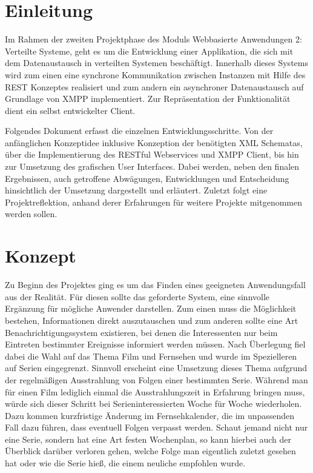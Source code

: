 \documentclass[a4paper]{article}
\begin{document}



\newpage

\tableofcontents

\newpage


\section{Einleitung}
Im Rahmen der zweiten Projektphase des Moduls Webbasierte Anwendungen 2: Verteilte Systeme, geht es um die Entwicklung einer Applikation, die sich mit dem Datenaustausch in verteilten Systemen beschäftigt. Innerhalb dieses Systems wird zum einen eine synchrone Kommunikation zwischen Instanzen mit Hilfe des REST Konzeptes realisiert und zum andern ein asynchroner Datenaustausch auf Grundlage von XMPP implementiert. Zur Repräsentation der Funktionalität dient ein selbst entwickelter Client. 

\parskip 12pt
\parindent 0pt
Folgendes Dokument erfasst die einzelnen Entwicklungsschritte. Von der anfänglichen Konzeptidee inklusive Konzeption der benötigten XML Schematas, über die Implementierung des RESTful Webservices und XMPP Client, bis hin zur Umsetzung des grafischen User Interfaces. Dabei werden, neben den finalen Ergebnissen, auch getroffene Abwägungen, Entwicklungen und Entscheidung hinsichtlich der Umsetzung dargestellt und erläutert. 
Zuletzt folgt eine Projektreflektion, anhand derer Erfahrungen für weitere Projekte mitgenommen werden sollen.


\section{Konzept}
Zu Beginn des Projektes ging es um das Finden eines geeigneten Anwendungsfall aus der Realität. Für diesen sollte das geforderte System, eine sinnvolle Ergänzung für mögliche Anwender darstellen.
Zum einen muss die Möglichkeit bestehen, Informationen direkt auszutauschen und zum anderen sollte eine Art Benachrichtigungssystem existieren, bei denen die Interessenten nur beim Eintreten bestimmter Ereignisse informiert werden müssen.
Nach Überlegung fiel dabei die Wahl auf das Thema Film und Fernsehen und wurde im Spezielleren auf Serien eingegrenzt. Sinnvoll erscheint eine Umsetzung dieses Thema aufgrund der regelmäßigen Ausstrahlung von Folgen einer bestimmten Serie.
Während man für einen Film lediglich einmal die Ausstrahlungszeit in Erfahrung bringen muss, würde sich dieser Schritt bei Serieninteressierten Woche für Woche wiederholen. Dazu kommen kurzfristige Änderung im Fernsehkalender, die im unpassenden Fall dazu führen, dass eventuell Folgen verpasst werden. Schaut jemand nicht nur eine Serie, sondern hat eine Art festen Wochenplan, so kann hierbei auch der Überblick darüber verloren gehen, welche Folge man eigentlich zuletzt gesehen hat oder wie die Serie hieß, die einem neuliche empfohlen wurde. 
\end{document}

